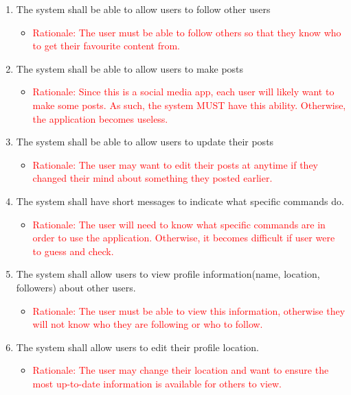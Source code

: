 \documentclass[12pt, titlepage]{article}
\begin{document}
\begin{enumerate}
\begin{itemize}
        \end{itemize}
    \item The system shall be able to allow users to follow other users
        \begin{itemize}
            \item \textcolor{red}{Rationale: The user must be able to follow others so that they know who to get their favourite content from.}
        \end{itemize}
    \item The system shall be able to allow users to make posts
        \begin{itemize}
            \item \textcolor{red}{Rationale: Since this is a social media app, each user will likely want to make some posts. As such, the system MUST have this ability. Otherwise, the application becomes useless.}
        \end{itemize}
    \item The system shall be able to allow users to update their posts
        \begin{itemize}
            \item \textcolor{red}{Rationale: The user may want to edit their posts at anytime if they changed their mind about something they posted earlier.}
        \end{itemize}
    \item The system shall have short messages to indicate what specific commands do.
        \begin{itemize}
            \item \textcolor{red}{Rationale: The user will need to know what specific commands are in order to use the application. Otherwise, it becomes difficult if user were to guess and check.}
        \end{itemize}
    \item The system shall allow users to view profile information(name, location, followers) about other users.
        \begin{itemize}
            \item \textcolor{red}{Rationale: The user must be able to view this information, otherwise they will not know who they are following or who to follow.}
        \end{itemize}
        
    \item The system shall allow users to edit their profile location.
        \begin{itemize}
            \item \textcolor{red}{Rationale: The user may change their location and want to ensure the most up-to-date information is available for others to view.}
        \end{itemize}
        

\end{enumerate}
\end{document}
